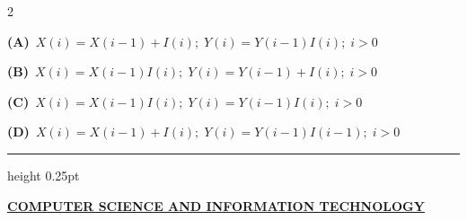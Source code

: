 \documentclass[a4paper,10pt,twoside]{article}
\begin{document}
\begin{multicols}{2}
{\begin{center}
\end{center} \par}
\par\vspace{2pt}\noindent
\textbf{(A)}~$X(i) = X(i-1) + I(i); \; Y(i) = Y(i-1) I(i); \; i > 0$\par\vspace{2pt}\noindent
\textbf{(B)}~$X(i) = X(i-1) I(i); \; Y(i) = Y(i-1) + I(i); \; i > 0$\par\vspace{2pt}\noindent
\textbf{(C)}~$X(i) = X(i-1) I(i); \; Y(i) = Y(i-1) I(i); \; i > 0$\par\vspace{2pt}\noindent
\textbf{(D)}~$X(i) = X(i-1) + I(i); \; Y(i) = Y(i-1) I(i-1); \; i > 0$
\par\vspace{6pt}\hrule height 0.25pt\vspace{6pt}

\vspace{8pt}
\noindent\textbf{\large\underline{COMPUTER SCIENCE AND INFORMATION TECHNOLOGY}}\\[2pt]
\vspace{4pt}


\end{multicols}
\end{document}
